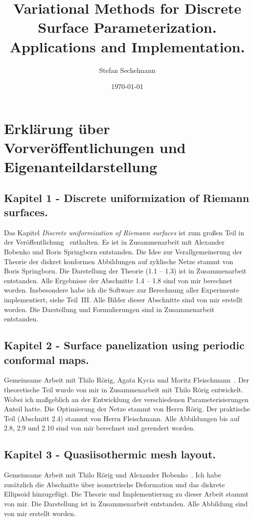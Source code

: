 \documentclass[11pt]{amsart}
\title{Variational Methods for Discrete Surface Parameterization. Applications and Implementation.}
\author{Stefan Sechelmann}
\date{\today}
\begin{document}
\maketitle

\section*{Erklärung über Vorveröffentlichungen und Eigenanteildarstellung}


\subsection*{Kapitel 1 - Discrete uniformization of Riemann surfaces.}
Das Kapitel \emph{Discrete uniformization of Riemann surfaces} ist zum großen Teil in der Veröffentlichung~\cite{BobSechSpr} enthalten. Es ist in Zusammenarbeit mit Alexander Bobenko und Boris Springborn entstanden.
Die Idee zur Verallgemeinerung der Theorie der diskret konformen Abbildungen auf zyklische Netze stammt von Boris Springborn. Die Darstellung der Theorie (1.1 -- 1.3) ist in Zusammenarbeit entstanden.
Alle Ergebnisse der Abschnitte 1.4 -- 1.8 sind von mir berechnet worden. Insbesondere habe ich die Software zur Berechnung aller Experimente implementiert, siehe Teil~III. Alle Bilder dieser Abschnitte sind von mir erstellt worden. Die Darstellung und Formulierungen sind in Zusammenarbeit entstanden.

\subsection*{Kapitel 2 - Surface panelization using periodic conformal maps.}
Gemeinsame Arbeit mit Thilo Rörig, Agata Kycia und Moritz Fleischmann~\cite{Roerig2014}.
Der theoretische Teil wurde von mir in Zusammenarbeit mit Thilo Rörig entwickelt. Wobei ich maßgeblich an der Entwicklung der verschiedenen Parameterisierungen Anteil hatte. Die Optimierung der Netze stammt von Herrn Rörig. Der praktische Teil (Abschnitt 2.4) stammt von Herrn Fleischmann. Alle Abbildungen bis auf 2.8, 2.9 und 2.10 sind von mir berechnet und gerendert worden.

\subsection*{Kapitel 3 - Quasiisothermic mesh layout.}
Gemeinsame Arbeit mit Thilo Rörig und Alexander Bobenko~\cite{Sechelmann2012}. Ich habe zusätzlich die Abschnitte über isometrische Deformation und das diskrete Ellipsoid hinzugefügt.
Die Theorie und Implementierung zu dieser Arbeit stammt von mir. Die Darstellung ist in Zusammenarbeit entstanden.
Alle Abbildung sind von mir erstellt worden.
\end{document}
